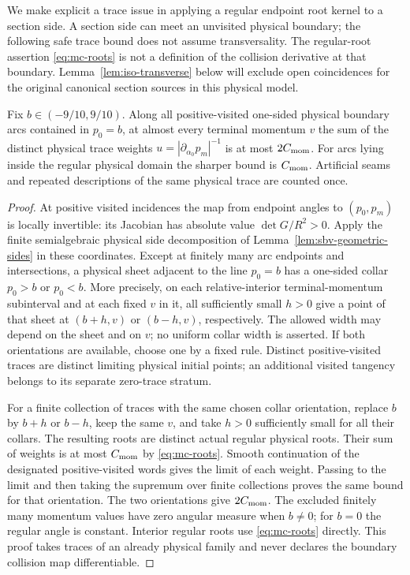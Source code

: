 We make explicit a trace issue in applying a regular endpoint root
kernel to a section side.  A section side can meet an
unvisited physical boundary; the following safe trace bound does
not assume transversality. The regular-root assertion
\eqref{eq:mc-roots} is not a definition of the collision derivative
at that boundary. Lemma~\ref{lem:iso-transverse} below will
exclude open coincidences for the original canonical section
sources in this physical model.

\begin{lemma}
\label{lem:es-trace-kernel}
Fix $b\in(-9/10,9/10)$.  Along all positive-visited one-sided
physical boundary arcs contained in $p_0=b$, at almost every
terminal momentum $v$ the sum of the distinct physical trace
weights $u=|\partial_{\alpha_0}p_m|^{-1}$ is at most
$2C_{\rm mom}$.  For arcs lying inside the regular physical
domain the sharper bound is $C_{\rm mom}$.  Artificial seams
and repeated descriptions of the same physical trace are counted
once.
\end{lemma}
\begin{proof}
At positive visited incidences the map from endpoint angles to
$(p_0,p_m)$ is locally invertible: its Jacobian has absolute value
$\det G/R^2>0$.  Apply the finite semialgebraic physical side
decomposition of Lemma~\ref{lem:sbv-geometric-sides} in these
coordinates.  Except at finitely many arc endpoints and
intersections, a physical sheet adjacent to the line $p_0=b$
has a one-sided collar $p_0>b$ or $p_0<b$.  More precisely, on
each relative-interior terminal-momentum subinterval and at each
fixed $v$ in it, all sufficiently small $h>0$ give a point of
that sheet at $(b+h,v)$ or $(b-h,v)$, respectively.  The allowed
width may depend on the sheet and on $v$; no uniform collar width
is asserted.  If both orientations are available,
choose one by a fixed rule.  Distinct positive-visited traces are
distinct limiting physical initial points; an additional visited
tangency belongs to its separate zero-trace stratum.

For a finite collection of traces with the same chosen collar
orientation, replace $b$ by $b+h$ or $b-h$, keep the same $v$,
and take $h>0$ sufficiently small for all their collars.  The
resulting roots are distinct actual regular physical roots.  Their
sum of weights is at most $C_{\rm mom}$ by
\eqref{eq:mc-roots}.  Smooth continuation of the designated
positive-visited words gives the limit of each weight.  Passing
to the limit and then taking the supremum over finite collections
proves the same bound for that orientation.  The two orientations
give $2C_{\rm mom}$.  The excluded finitely many momentum values
have zero angular measure when $b\ne0$; for $b=0$ the regular
angle is constant.  Interior regular roots use
\eqref{eq:mc-roots} directly.  This proof takes traces of an
already physical family and never declares the boundary collision
map differentiable.
\end{proof}

